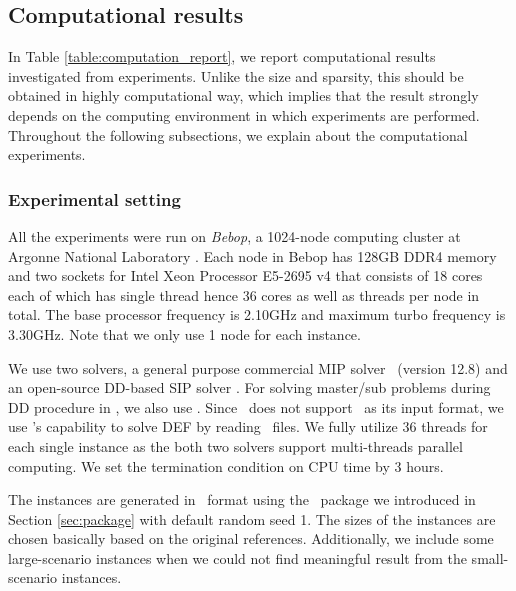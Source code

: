 \subsection{Computational results}
In Table \ref{table:computation_report}, we report computational results investigated from experiments. Unlike the size and sparsity, this should be obtained in highly computational way, which implies that the result strongly depends on the computing environment in which experiments are performed. Throughout the following subsections, we explain about the computational experiments.

\subsubsection{Experimental setting}
All the experiments were run on \textit{Bebop}, a 1024-node computing cluster at Argonne National Laboratory \cite{bebop}. Each node in Bebop has 128GB DDR4 memory and two sockets for Intel Xeon Processor E5-2695 v4 that consists of 18 cores each of which has single thread hence 36 cores as well as threads per node in total. The base processor frequency is 2.10GHz and maximum turbo frequency is 3.30GHz. Note that we only use 1 node for each instance.

We use two solvers, a general purpose commercial MIP solver \cplex\ (version 12.8) and an open-source DD-based SIP solver \dsp. For solving master/sub problems during DD procedure in \dsp, we also use \cplex. Since \cplex\ does not support \smps\ as its input format, we use \dsp's capability to solve DEF by reading \smps\ files. We fully utilize 36 threads for each single instance as the both two solvers support multi-threads parallel computing. We set the termination condition on CPU time by 3 hours. 

The instances are generated in \smps\ format using the \julia\ package we introduced in Section \ref{sec:package} with default random seed 1. The sizes of the instances are chosen basically based on the original references. Additionally, we include some large-scenario instances when we could not find meaningful result from the small-scenario instances.

